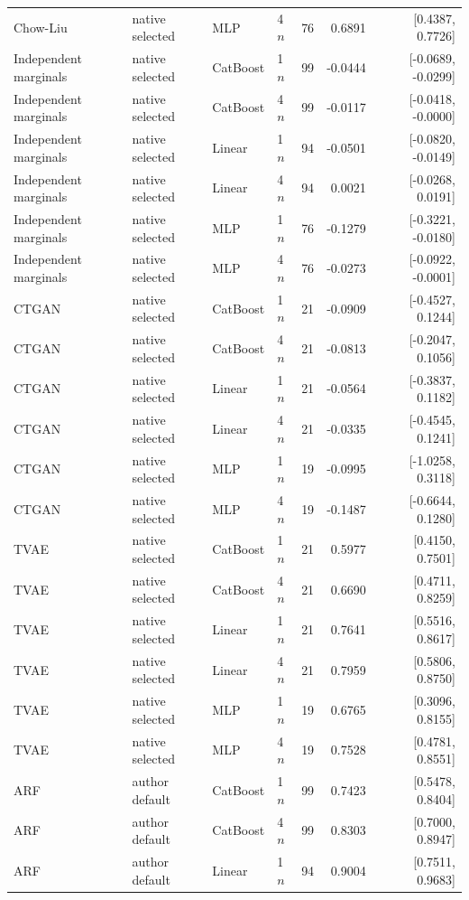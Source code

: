 \begin{longtable}{lllllrr}
Chow-Liu & native selected & MLP & 4$n$ & 76 & 0.6891 & [0.4387, 0.7726] \\
Independent marginals & native selected & CatBoost & 1$n$ & 99 & -0.0444 & [-0.0689, -0.0299] \\
Independent marginals & native selected & CatBoost & 4$n$ & 99 & -0.0117 & [-0.0418, -0.0000] \\
Independent marginals & native selected & Linear & 1$n$ & 94 & -0.0501 & [-0.0820, -0.0149] \\
Independent marginals & native selected & Linear & 4$n$ & 94 & 0.0021 & [-0.0268, 0.0191] \\
Independent marginals & native selected & MLP & 1$n$ & 76 & -0.1279 & [-0.3221, -0.0180] \\
Independent marginals & native selected & MLP & 4$n$ & 76 & -0.0273 & [-0.0922, -0.0001] \\
CTGAN & native selected & CatBoost & 1$n$ & 21 & -0.0909 & [-0.4527, 0.1244] \\
CTGAN & native selected & CatBoost & 4$n$ & 21 & -0.0813 & [-0.2047, 0.1056] \\
CTGAN & native selected & Linear & 1$n$ & 21 & -0.0564 & [-0.3837, 0.1182] \\
CTGAN & native selected & Linear & 4$n$ & 21 & -0.0335 & [-0.4545, 0.1241] \\
CTGAN & native selected & MLP & 1$n$ & 19 & -0.0995 & [-1.0258, 0.3118] \\
CTGAN & native selected & MLP & 4$n$ & 19 & -0.1487 & [-0.6644, 0.1280] \\
TVAE & native selected & CatBoost & 1$n$ & 21 & 0.5977 & [0.4150, 0.7501] \\
TVAE & native selected & CatBoost & 4$n$ & 21 & 0.6690 & [0.4711, 0.8259] \\
TVAE & native selected & Linear & 1$n$ & 21 & 0.7641 & [0.5516, 0.8617] \\
TVAE & native selected & Linear & 4$n$ & 21 & 0.7959 & [0.5806, 0.8750] \\
TVAE & native selected & MLP & 1$n$ & 19 & 0.6765 & [0.3096, 0.8155] \\
TVAE & native selected & MLP & 4$n$ & 19 & 0.7528 & [0.4781, 0.8551] \\
ARF & author default & CatBoost & 1$n$ & 99 & 0.7423 & [0.5478, 0.8404] \\
ARF & author default & CatBoost & 4$n$ & 99 & 0.8303 & [0.7000, 0.8947] \\
ARF & author default & Linear & 1$n$ & 94 & 0.9004 & [0.7511, 0.9683] \\

\end{longtable}
